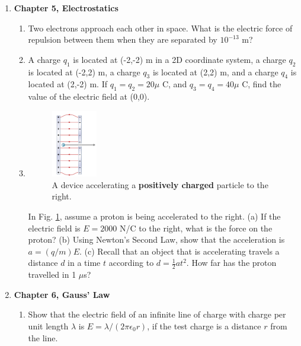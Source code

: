 \documentclass[10pt]{article}
\begin{document}
\clearpage

\begin{enumerate}
\item \textbf{Chapter 5, Electrostatics}
\begin{enumerate}
\item Two electrons approach each other in space.  What is the electric force of repulsion between them when they are separated by $10^{-13}$ m? \\ \vspace{1cm}
\item A charge $q_1$ is located at (-2,-2) m in a 2D coordinate system, a charge $q_2$ is located at (-2,2) m, a charge $q_3$ is located at (2,2) m, and a charge $q_4$ is located at (2,-2) m.  If $q_1 = q_2 = 20\mu$ C, and $q_3 = q_4 = 40\mu$ C, find the value of the electric field at (0,0). \\ \vspace{2cm}
\item 
\begin{figure}
\centering
\includegraphics[width=0.2\textwidth]{figures/cap.png}
\caption{\label{fig:cap} A device accelerating a \textbf{positively charged} particle to the right.}
\end{figure}
In Fig. \ref{fig:cap}, assume a proton is being accelerated to the right.  (a) If the electric field is $E = 2000$ N/C to the right, what is the force on the proton?  (b) Using Newton's Second Law, show that the acceleration is $a = (q/m) E$.  (c)  Recall that an object that is accelerating travels a distance $d$ in a time $t$ according to $d = \frac{1}{2}at^2$.  How far has the proton travelled in 1 $\mu$s? \\ \vspace{3cm}
\end{enumerate}
\item \textbf{Chapter 6, Gauss' Law}
\begin{enumerate}
\item Show that the electric field of an infinite line of charge with charge per unit length $\lambda$ is $E = \lambda/(2\pi \epsilon_0 r)$, if the test charge is a distance $r$ from the line. \\ \vspace{3cm}

\end{enumerate}
\end{enumerate}
\end{document}
